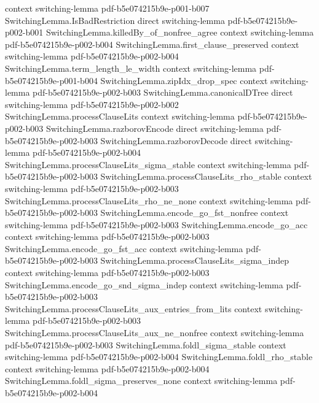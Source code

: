 \begin{theorem}
  {context}
  {switching-lemma}
  {pdf-b5e074215b9e-p001-b007}
\proofstep
  {SwitchingLemma.IsBadRestriction}
  {direct}
  {switching-lemma}
  {pdf-b5e074215b9e-p002-b001}
\proofstep
  {SwitchingLemma.killedBy_of_nonfree_agree}
  {context}
  {switching-lemma}
  {pdf-b5e074215b9e-p002-b004}
\proofstep
  {SwitchingLemma.first_clause_preserved}
  {context}
  {switching-lemma}
  {pdf-b5e074215b9e-p002-b004}
\proofstep
  {SwitchingLemma.term_length_le_width}
  {context}
  {switching-lemma}
  {pdf-b5e074215b9e-p001-b004}
\proofstep
  {SwitchingLemma.zipIdx_drop_spec}
  {context}
  {switching-lemma}
  {pdf-b5e074215b9e-p002-b003}
\proofstep
  {SwitchingLemma.canonicalDTree}
  {direct}
  {switching-lemma}
  {pdf-b5e074215b9e-p002-b002}
\proofstep
  {SwitchingLemma.processClauseLits}
  {context}
  {switching-lemma}
  {pdf-b5e074215b9e-p002-b003}
\proofstep
  {SwitchingLemma.razborovEncode}
  {direct}
  {switching-lemma}
  {pdf-b5e074215b9e-p002-b003}
\proofstep
  {SwitchingLemma.razborovDecode}
  {direct}
  {switching-lemma}
  {pdf-b5e074215b9e-p002-b004}
\proofstep
  {SwitchingLemma.processClauseLits_sigma_stable}
  {context}
  {switching-lemma}
  {pdf-b5e074215b9e-p002-b003}
\proofstep
  {SwitchingLemma.processClauseLits_rho_stable}
  {context}
  {switching-lemma}
  {pdf-b5e074215b9e-p002-b003}
\proofstep
  {SwitchingLemma.processClauseLits_rho_ne_none}
  {context}
  {switching-lemma}
  {pdf-b5e074215b9e-p002-b003}
\proofstep
  {SwitchingLemma.encode_go_fst_nonfree}
  {context}
  {switching-lemma}
  {pdf-b5e074215b9e-p002-b003}
\proofstep
  {SwitchingLemma.encode_go_acc}
  {context}
  {switching-lemma}
  {pdf-b5e074215b9e-p002-b003}
\proofstep
  {SwitchingLemma.encode_go_fst_acc}
  {context}
  {switching-lemma}
  {pdf-b5e074215b9e-p002-b003}
\proofstep
  {SwitchingLemma.processClauseLits_sigma_indep}
  {context}
  {switching-lemma}
  {pdf-b5e074215b9e-p002-b003}
\proofstep
  {SwitchingLemma.encode_go_snd_sigma_indep}
  {context}
  {switching-lemma}
  {pdf-b5e074215b9e-p002-b003}
\proofstep
  {SwitchingLemma.processClauseLits_aux_entries_from_lits}
  {context}
  {switching-lemma}
  {pdf-b5e074215b9e-p002-b003}
\proofstep
  {SwitchingLemma.processClauseLits_aux_ne_nonfree}
  {context}
  {switching-lemma}
  {pdf-b5e074215b9e-p002-b003}
\proofstep
  {SwitchingLemma.foldl_sigma_stable}
  {context}
  {switching-lemma}
  {pdf-b5e074215b9e-p002-b004}
\proofstep
  {SwitchingLemma.foldl_rho_stable}
  {context}
  {switching-lemma}
  {pdf-b5e074215b9e-p002-b004}
\proofstep
  {SwitchingLemma.foldl_sigma_preserves_none}
  {context}
  {switching-lemma}
  {pdf-b5e074215b9e-p002-b004}

\end{theorem}
